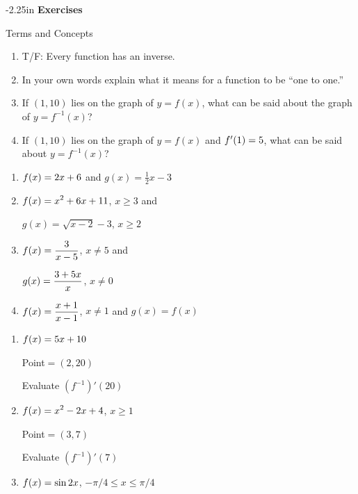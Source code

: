 \begin{adjustwidth*}{}{-2.25in}
\textbf{{\large Exercises}}
\setlength{\columnsep}{25pt}
\begin{multicols*}{2}
\noindent Terms and Concepts \small
\begin{enumerate}[1)]
\item T/F: Every function has an inverse.
\item In your own words explain what it means for a function to be ``one to one.''
\item If $(1,10)$ lies on the graph of $y=f(x)$, what can be said about the graph of $y=f^{-1}(x)$?
\item If $(1,10)$ lies on the graph of $y=f(x)$ and $f'(1) = 5$, what can be said about $y=f^{-1}(x)$?
\end{enumerate} 

 \small


\begin{enumerate}[1),resume]
\item $\displaystyle f(x) = 2x+6$ and $g(x) = \frac12x-3$
\item $\displaystyle f(x) = x^2+6x+11$, $x\geq 3$ and 

$g(x) = \sqrt{x-2}-3$, $x\geq 2$
\item $\displaystyle f(x) = \frac{3}{x-5}$, $x\neq 5$ and 

$\displaystyle g(x) = \frac{3+5x}{x}$, $x\neq 0$
\item $\displaystyle f(x) = \frac{x+1}{x-1}$, $x\neq 1$ and $g(x) = f(x)$
\end{enumerate}


\begin{enumerate}[1),resume]
\item $\displaystyle f(x) = 5x+10$

Point$=(2,20)$ 

Evaluate $\left(f^{-1}\right)'(20)$

\item $\displaystyle f(x) = x^2-2x+4$, $x\geq 1$

Point$=(3,7)$ 

Evaluate $\left(f^{-1}\right)'(7)$

\item $\displaystyle f(x) = \sin 2x$, $-\pi/4\leq x\leq \pi/4$


\end{enumerate}
\end{multicols*}
\end{adjustwidth*}
